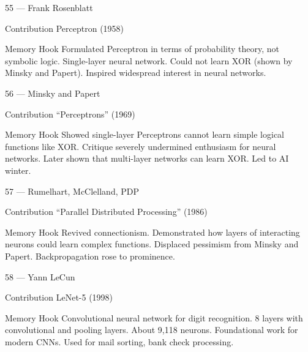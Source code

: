 \documentclass[aspectratio=169,8pt]{beamer}
\begin{document}
	\begin{frame}{55 --- Frank Rosenblatt}
		\begin{block}{Contribution}
			Perceptron (1958)
		\end{block}
		\begin{block}{Memory Hook}
			Formulated Perceptron in terms of probability theory, not symbolic logic. Single-layer neural network. Could not learn XOR (shown by Minsky and Papert). Inspired widespread interest in neural networks.
		\end{block}
	\end{frame}
	
	\begin{frame}{56 --- Minsky and Papert}
		\begin{block}{Contribution}
			``Perceptrons'' (1969)
		\end{block}
		\begin{block}{Memory Hook}
			Showed single-layer Perceptrons cannot learn simple logical functions like XOR. Critique severely undermined enthusiasm for neural networks. Later shown that multi-layer networks can learn XOR. Led to AI winter.
		\end{block}
	\end{frame}
	
	\begin{frame}{57 --- Rumelhart, McClelland, PDP}
		\begin{block}{Contribution}
			``Parallel Distributed Processing'' (1986)
		\end{block}
		\begin{block}{Memory Hook}
			Revived connectionism. Demonstrated how layers of interacting neurons could learn complex functions. Displaced pessimism from Minsky and Papert. Backpropagation rose to prominence.
		\end{block}
	\end{frame}
	
	\begin{frame}{58 --- Yann LeCun}
		\begin{block}{Contribution}
			LeNet-5 (1998)
		\end{block}
		\begin{block}{Memory Hook}
			Convolutional neural network for digit recognition. 8 layers with convolutional and pooling layers. About 9,118 neurons. Foundational work for modern CNNs. Used for mail sorting, bank check processing.
		\end{block}
	\end{frame}
	
\end{document}
